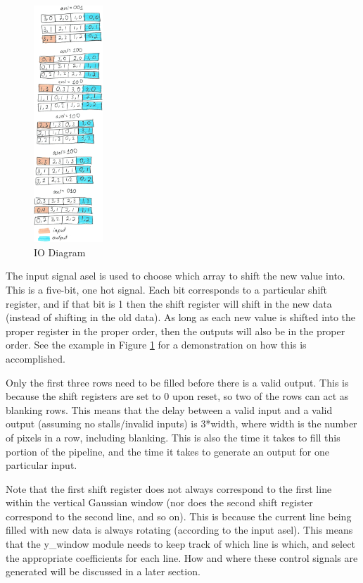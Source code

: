 \begin{figure}
    \includegraphics[width=0.23\textwidth]{processed_image_pngs/io_diagram.png}
    \caption{IO Diagram}
    \label{fig:io}
\end{figure}


The input signal asel is used to choose which array to shift the new value into. 
This is a five-bit, one hot signal. Each bit corresponds to a particular 
shift register, and if that bit is 1 then the shift register will shift in the 
new data (instead of shifting in the old data). As long as each new value is 
shifted into the proper register in the proper order, then the outputs will also 
be in the proper order. See the example in Figure \ref{fig:io} for a demonstration 
on how this is accomplished.

Only the first three rows need to be filled before there is a valid output. This 
is because the shift registers are set to 0 upon reset, so two of the rows can 
act as blanking rows. This means that the delay between a valid input and 
a valid output (assuming no stalls/invalid inputs) is 3*width, where width is 
the number of pixels in a row, including blanking. This is also the time it 
takes to fill this portion of the pipeline, and the time it takes to generate an 
output for one particular input.

Note that the first shift register does not always correspond to the first line 
within the vertical Gaussian window (nor does the second shift register 
correspond to the second line, and so on). This is because the current line 
being filled with new data is always rotating (according to the input asel). 
This means that the y\_window module needs to keep track of which line is which, 
and select the appropriate coefficients for each line. How and where these 
control signals are generated will be discussed in a later section.


